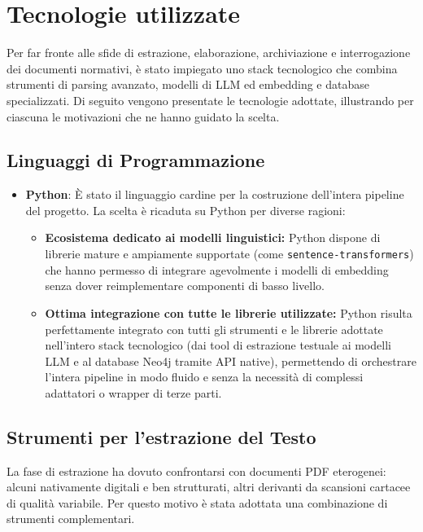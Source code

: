 \chapter{Tecnologie utilizzate}\label{chap:second}
Per far fronte alle sfide di estrazione, elaborazione, archiviazione e interrogazione dei documenti normativi, è stato impiegato uno stack tecnologico che combina strumenti di parsing avanzato, modelli di LLM ed embedding e database specializzati. Di seguito vengono presentate le tecnologie adottate, illustrando per ciascuna le motivazioni che ne hanno guidato la scelta.

\section{Linguaggi di Programmazione}
\begin{itemize}
    \item \textbf{Python}: È stato il linguaggio cardine per la costruzione dell'intera pipeline del progetto. La scelta è ricaduta su Python per diverse ragioni:
    \begin{itemize}
        \item \textbf{Ecosistema dedicato ai modelli linguistici:} Python dispone di librerie mature e ampiamente supportate (come \texttt{sentence-transformers}) che hanno permesso di integrare agevolmente i modelli di embedding senza dover reimplementare componenti di basso livello.
        \item \textbf{Ottima integrazione con tutte le librerie utilizzate:} Python risulta perfettamente integrato con tutti gli strumenti e le librerie adottate nell'intero stack tecnologico (dai tool di estrazione testuale ai modelli LLM e al database Neo4j tramite API native), permettendo di orchestrare l'intera pipeline in modo fluido e senza la necessità di complessi adattatori o wrapper di terze parti.
    \end{itemize}
\end{itemize}

\section{Strumenti per l'estrazione del Testo}
La fase di estrazione ha dovuto confrontarsi con documenti PDF eterogenei: alcuni nativamente digitali e ben strutturati, altri derivanti da scansioni cartacee di qualità variabile. Per questo motivo è stata adottata una combinazione di strumenti complementari.

